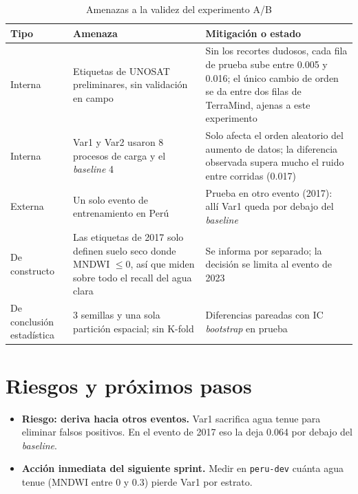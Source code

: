 \begin{table}[H]
    \centering
    \small
    \caption{Amenazas a la validez del experimento A/B}
    \label{tab:sprint_amenazas}
    \begin{tabular}{|p{2.6cm}|p{5.8cm}|p{6.0cm}|}
        \hline
        \textbf{Tipo} & \textbf{Amenaza} & \textbf{Mitigación o estado} \\
        \hline
        Interna & Etiquetas de UNOSAT preliminares, sin validación en campo & Sin los recortes dudosos, cada fila de prueba sube entre 0.005 y 0.016; el único cambio de orden se da entre dos filas de TerraMind, ajenas a este experimento \\
        \hline
        Interna & Var1 y Var2 usaron 8 procesos de carga y el \textit{baseline} 4 & Solo afecta el orden aleatorio del aumento de datos; la diferencia observada supera mucho el ruido entre corridas (0.017) \\
        \hline
        Externa & Un solo evento de entrenamiento en Perú & Prueba en otro evento (2017): allí Var1 queda por debajo del \textit{baseline} \\
        \hline
        De constructo & Las etiquetas de 2017 solo definen suelo seco donde MNDWI $\leq 0$, así que miden sobre todo el recall del agua clara & Se informa por separado; la decisión se limita al evento de 2023 \\
        \hline
        De conclusión estadística & 3 semillas y una sola partición espacial; sin K-fold & Diferencias pareadas con IC \textit{bootstrap} en prueba \\
        \hline
    \end{tabular}
\end{table}

\section{Riesgos y próximos pasos}

\begin{itemize}
    \item \textbf{Riesgo: deriva hacia otros eventos.} Var1 sacrifica agua tenue para eliminar
    falsos positivos. En el evento de 2017 eso la deja 0.064 por debajo del \textit{baseline}.
    \item \textbf{Acción inmediata del siguiente sprint.} Medir en \texttt{peru-\allowbreak{}dev} cuánta agua tenue
    (MNDWI entre 0 y 0.3) pierde Var1 por estrato.
\end{itemize}

